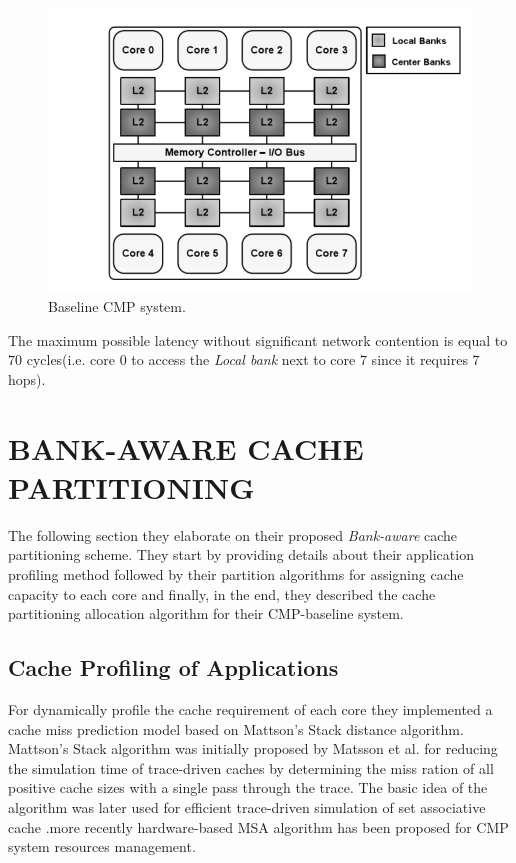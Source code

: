 \documentclass{report}
\begin{document}
\begin{figure}[t]
\includegraphics[width=1\textwidth]{./fig18}
\caption{  Baseline CMP system.}
\label{fig18}
\end{figure}

The maximum possible latency without significant network contention is equal to $70$ cycles(i.e. core 0 to access the \emph{Local bank} next to core $7$ since it requires $7$ hops).

\section{BANK-AWARE CACHE PARTITIONING}

The following section they elaborate on their proposed \emph{Bank-aware} cache partitioning scheme. They start by providing details about their application profiling method followed by their partition algorithms for assigning cache capacity to each core and finally, in the end, they described the cache partitioning allocation algorithm for their CMP-baseline system.

\renewcommand\thesubsection{\Alph{subsection}.}
 \subsection{Cache Profiling of Applications}
For dynamically profile the cache requirement of each core they implemented a cache miss prediction model
based on Mattson's Stack distance algorithm. Mattson's Stack algorithm was initially proposed by Matsson et al. for reducing the simulation time of trace-driven caches by determining the miss ration of all positive cache sizes with a single pass through the trace. The basic idea of the algorithm was later used for efficient trace-driven simulation of set associative cache .more recently hardware-based MSA algorithm has been proposed for CMP system resources management.
\end{document}
